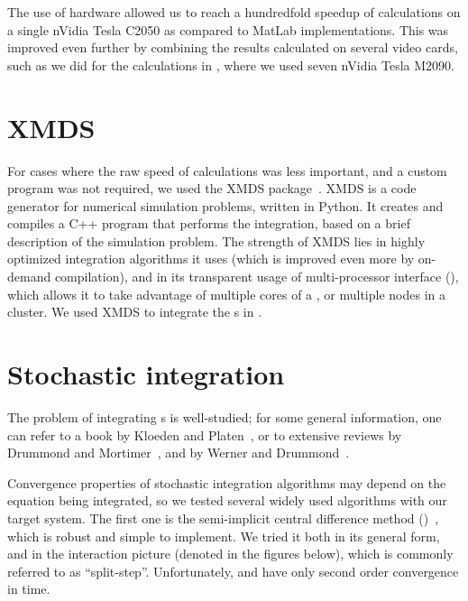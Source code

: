 The use of  hardware allowed us to reach a hundredfold speedup of calculations on a single nVidia Tesla C2050 as compared to MatLab implementations.
This was improved even further by combining the results calculated on several video cards, such as we did for the calculations in , where we used seven nVidia Tesla M2090.


\section{XMDS}

For cases where the raw speed of calculations was less important, and a custom  program was not required, we used the XMDS package~\cite{Collecutt2001,Dennis2013}.
XMDS is a code generator for numerical simulation problems, written in Python.
It creates and compiles a C++ program that performs the integration, based on a brief  description of the simulation problem.
The strength of XMDS lies in highly optimized integration algorithms it uses (which is improved even more by on-demand compilation), and in its transparent usage of multi-processor interface (), which allows it to take advantage of multiple cores of a , or multiple nodes in a cluster.
We used XMDS to integrate the s in .


\section{Stochastic integration}

The problem of integrating s is well-studied; for some general information, one can refer to a book by Kloeden and Platen~\cite{Kloeden1992}, or to extensive reviews by Drummond and Mortimer~\cite{Drummond1991}, and by Werner and Drummond~\cite{Werner1997}.

Convergence properties of stochastic integration algorithms may depend on the equation being integrated, so we tested several widely used algorithms with our target system.
The first one is the semi-implicit central difference method ()~\cite{Werner1997}, which is robust and simple to implement.
We tried it both in its general form, and in the interaction picture (denoted  in the figures below), which is commonly referred to as ``split-step''.
Unfortunately,  and  have only second order convergence in time.

